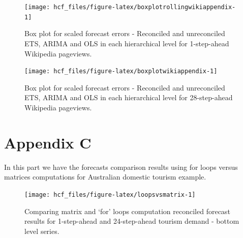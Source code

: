 \documentclass[11pt,a4paper,]{article}
\begin{document}
\begin{figure}

{\centering \texttt{[image: hcf\_files/figure-latex/boxplotrollingwikiappendix-1]} 

}

\caption{Box plot for scaled forecast errors - Reconciled and unreconciled ETS, ARIMA and OLS in each hierarchical level for 1-step-ahead Wikipedia pageviews.}\label{fig:boxplotrollingwikiappendix}
\end{figure}

\begin{figure}

{\centering \texttt{[image: hcf\_files/figure-latex/boxplotwikiappendix-1]} 

}

\caption{Box plot for scaled forecast errors - Reconciled and unreconciled ETS, ARIMA and OLS in each hierarchical level for 28-step-ahead Wikipedia pageviews.}\label{fig:boxplotwikiappendix}
\end{figure}

\hypertarget{appendixC}{%
\section*{Appendix C}\label{appendixC}}

In this part we have the forecasts comparison results using for loops
versus matrices computations for Australian domestic tourism example.

\begin{figure}

{\centering \texttt{[image: hcf\_files/figure-latex/loopsvsmatrix-1]} 

}

\caption{Comparing matrix and `for' loops computation reconciled forecast results for 1-step-ahead and 24-step-ahead tourism demand - bottom level series.}\label{fig:loopsvsmatrix}
\end{figure}

\printbibliography
\end{document}
